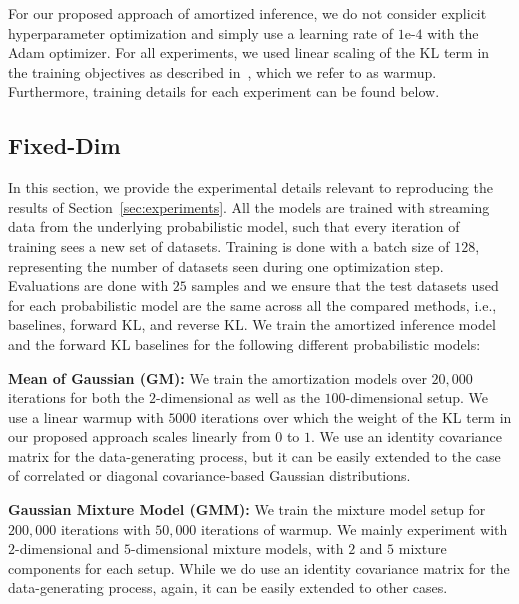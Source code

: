 For our proposed approach of amortized inference, we do not consider explicit hyperparameter optimization and simply use a learning rate of $1\mathrm{e}\text{-}4$ with the Adam optimizer. For all experiments, we used linear scaling of the KL term in the training objectives as described in~\citep{higgins2017betavae}, which we refer to as warmup. Furthermore, training details for each experiment can be found below. 

\subsection{Fixed-Dim}
\label{appdx:details_fixed_dim}
In this section, we provide the experimental details relevant to reproducing the results of Section~\ref{sec:experiments}. All the models are trained with streaming data from the underlying probabilistic model, such that every iteration of training sees a new set of datasets. Training is done with a batch size of $128$, representing the number of datasets seen during one optimization step. Evaluations are done with $25$ samples and we ensure that the test datasets used for each probabilistic model are the same across all the compared methods, i.e., baselines, forward KL, and reverse KL. We train the amortized inference model and the forward KL baselines for the following different probabilistic models:

\textbf{Mean of Gaussian (GM):} We train the amortization models over $20,000$ iterations for both the $2$-dimensional as well as the $100$-dimensional setup. We use a linear warmup with $5000$ iterations over which the weight of the KL term in our proposed approach scales linearly from $0$ to $1$. We use an identity covariance matrix for the data-generating process, but it can be easily extended to the case of correlated or diagonal covariance-based Gaussian distributions.

\textbf{Gaussian Mixture Model (GMM):} We train the mixture model setup for $200,000$ iterations with $50,000$ iterations of warmup. We mainly experiment with $2$-dimensional and $5$-dimensional mixture models, with $2$ and $5$ mixture components for each setup. While we do use an identity covariance matrix for the data-generating process, again, it can be easily extended to other cases.

